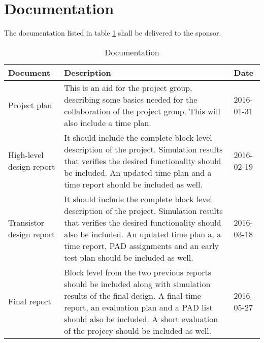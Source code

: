 \section{Documentation}
The documentation listed in table \ref{dokumentation:tabell} shall be delivered to the sponsor.

\begin{table}[H]
  \centering
  \begin{tabularx}{\textwidth}{| l | X | l |}
    \hline
    \textbf{Document} & \textbf{Description} & \textbf{Date} \\\hline
	   {Project plan} & {This is an aid for the project group, describing some basics needed for the collaboration of the project group. This will also include a time plan.} & {2016-01-31} \\\hline
	   {High-level design report} & {It should include the complete block level description of the project. Simulation results that verifies the desired functionality should be included. An updated time plan and a time report should be included as well.} & {2016-02-19} \\\hline
	   {Transistor design report} & {It should include the complete block level description of the project. Simulation results that verifies the desired functionality should also be included. An updated time plan a, a time report, PAD assignments and an early test plan should be included as well. } & {2016-03-18} \\\hline
	   {Final report} & {Block level from the two previous reports should be included along with simulation results of the final design. A final time report, an evaluation plan and a PAD list should also be included. A short evaluation of the projecy should be included as well.} & {2016-05-27} \\\hline
  \end{tabularx}
  \caption{Documentation} \label{dokumentation:tabell}
\end{table}
